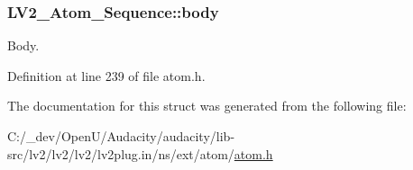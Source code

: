 \subsubsection[{\texorpdfstring{body}{body}}]{ L\+V2\+\_\+\+Atom\+\_\+\+Sequence\+::body}\hypertarget{struct_l_v2___atom___sequence_ab676c64fc85280dea192e5d879b1b9b2}{}\label{struct_l_v2___atom___sequence_ab676c64fc85280dea192e5d879b1b9b2}
Body. 

Definition at line 239 of file atom.\+h.



The documentation for this struct was generated from the following file\+:\begin{DoxyCompactItemize}
\item 
C\+:/\+\_\+dev/\+Open\+U/\+Audacity/audacity/lib-\/src/lv2/lv2/lv2/lv2plug.\+in/ns/ext/atom/\hyperlink{atom_8h}{atom.\+h}\end{DoxyCompactItemize}
